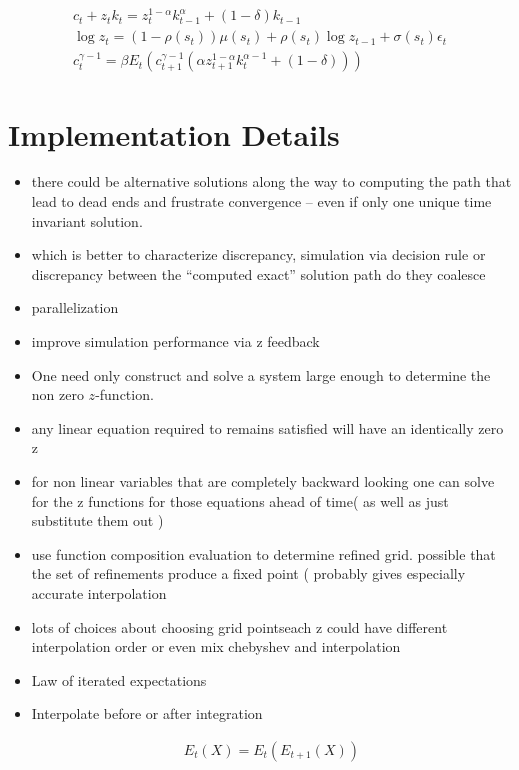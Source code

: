 \documentclass[12pt]{article}
\begin{document}
\begin{gather*}
c_t + z_t k_t = z_t^{1-\alpha} k_{t-1}^\alpha + (1-\delta)k_{t-1}\\
 \log z_t = (1-\rho(s_t))\mu(s_t) + \rho(s_t)\log z_{t-1}+ \sigma(s_t) \epsilon_t\\
 c_t^{\gamma-1} = \beta  
 E_t ( c_{t+1}^{\gamma-1} (\alpha z_{t+1}^{1-\alpha} k_t^{\alpha -1} + (1-\delta) ))
\end{gather*}



\section{Implementation Details }
\label{sec:implementation}



\begin{itemize}
\item there could be alternative solutions along the way to computing the path that lead to dead ends and frustrate convergence -- even if only one unique time invariant solution.
\item which is better to characterize discrepancy, simulation via decision rule or discrepancy between the ``computed exact'' solution path  do they coalesce
\item parallelization
\item improve simulation performance via z feedback
\item One need only construct and solve a system large enough to determine the non zero $z$-function.
\item any linear equation required to remains satisfied will have an identically zero z
\item for non linear variables that are completely backward looking one can solve for the z functions for those equations 
ahead of time( as well as just substitute them out )
\item use function composition evaluation to determine refined grid. possible that the set of refinements produce a fixed point  ( probably gives especially accurate interpolation
\item lots of choices about choosing grid pointseach z could have different interpolation order or even mix chebyshev and interpolation
\item Law of iterated expectations
\item Interpolate before or after integration

  \begin{gather}
    E_t(X) = E_t(E_{t+1}(X))
  \end{gather}
\end{itemize}
  
\end{document}
